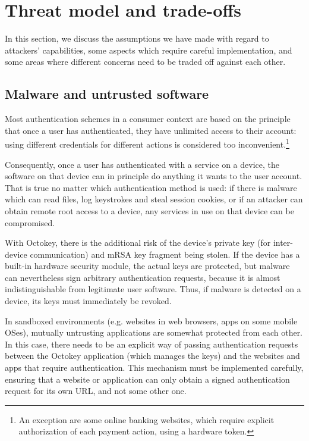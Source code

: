 \section{Threat model and trade-offs}\label{sec:threat}

In this section, we discuss the assumptions we have made with regard to attackers' capabilities,
some aspects which require careful implementation, and some areas where different concerns need to
be traded off against each other.

\subsection{Malware and untrusted software}

Most authentication schemes in a consumer context are based on the principle that once a user has
authenticated, they have unlimited access to their account: using different credentials for
different actions is considered too inconvenient.\footnote{An exception are some online banking
websites, which require explicit authorization of each payment action, using a hardware token.}

Consequently, once a user has authenticated with a service on a device, the software on that device
can in principle do anything it wants to the user account. That is true no matter which
authentication method is used: if there is malware which can read files, log keystrokes and steal
session cookies, or if an attacker can obtain remote root access to a device, any services in use on
that device can be compromised.

With Octokey, there is the additional risk of the device's private key (for inter-device
communication) and mRSA key fragment being stolen. If the device has a built-in hardware security
module, the actual keys are protected, but malware can nevertheless sign arbitrary authentication
requests, because it is almost indistinguishable from legitimate user software. Thus, if malware is
detected on a device, its keys must immediately be revoked.

In sandboxed environments (e.g. websites in web browsers, apps on some mobile OSes), mutually
untrusting applications are somewhat protected from each other. In this case, there needs to be an
explicit way of passing authentication requests between the Octokey application (which manages the
keys) and the websites and apps that require authentication. This mechanism must be implemented
carefully, ensuring that a website or application can only obtain a signed authentication request
for its own URL, and not some other one.

